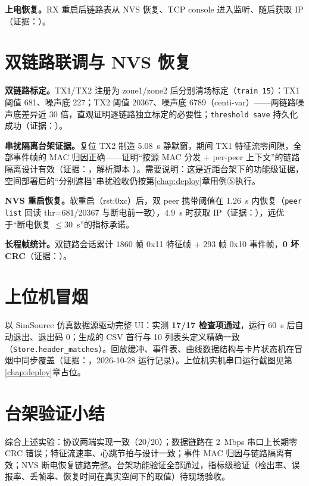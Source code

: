 \textbf{上电恢复。}RX 重启后链路表从 NVS 恢复、TCP console 进入监听、随后获取 IP（证据：）。

\section{双链路联调与 NVS 恢复}\label{sec:m4result}

\textbf{双链路标定。}TX1/TX2 注册为 zone1/zone2 后分别清场标定（\texttt{train 15}）：TX1 阈值 681、噪声底 227；TX2 阈值 20367、噪声底 6789（centi-var）——两链路噪声底差异近 30 倍，直观证明逐链路独立标定的必要性；\texttt{threshold save} 持久化成功（证据：）。

\textbf{串扰隔离台架证据。}复位 TX2 制造 5.08~s 静默窗，期间 TX1 特征流零间隙，全部事件帧的 MAC 归因正确——证明“按源 MAC 分发 + per-peer 上下文”的链路隔离设计有效（证据：，解析脚本 ）。需要说明：这是近距台架下的功能级证据，空间部署后的“分别遮挡”串扰验收仍按第\ref{chap:deploy}章用例⑤执行。

\textbf{NVS 重启恢复。}软重启（rst:0xc）后，双 peer 携带阈值在 1.26~s 内恢复（\texttt{peer list} 回读 thr=681/20367 与断电前一致），4.9~s 时获取 IP（证据：），远优于“断电恢复 $\le$30~s”的指标承诺。

\textbf{长程帧统计。}双链路会话累计 1860 帧 0x11 特征帧 + 293 帧 0x10 事件帧，\textbf{0 坏 CRC}（证据：）。

\section{上位机冒烟}\label{sec:smoke}

 以 SimSource 仿真数据源驱动完整 UI：实测 \textbf{17/17 检查项通过}，运行 60~s 后自动退出、退出码 0；生成的 CSV 首行与 10 列表头定义精确一致（\texttt{Store.header\_matches}）。回放缓冲、事件表、曲线数据结构与卡片状态机在冒烟中同步覆盖（证据：，2026-10-28 运行记录）。上位机实机串口运行截图见第\ref{chap:deploy}章占位。

\section{台架验证小结}

综合上述实验：协议两端实现一致（20/20）；数据链路在 2~Mbps 串口上长期零 CRC 错误；特征流速率、心跳节拍与设计一致；事件 MAC 归因与链路隔离有效；NVS 断电恢复链路完整。台架功能验证全部通过，指标级验证（检出率、误报率、丢帧率、恢复时间在真实空间下的取值）待现场验收。
